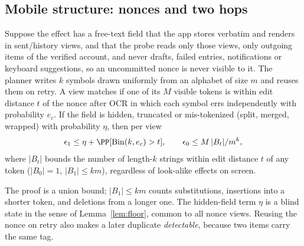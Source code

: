 \subsection{Mobile structure: nonces and two hops}
\label{sec:twohop}
\begin{lemma}
\label{lem:nonce}
Suppose the effect has a free-text field that the app stores verbatim and renders in sent/history views, and that the probe reads only those views, only outgoing items of
the verified account, and never drafts, failed entries, notifications or keyboard suggestions, so an uncommitted nonce is never visible to it. The planner writes $k$ symbols
drawn uniformly from an alphabet of size $m$ and reuses them on retry. A view matches if one of its $M$ visible tokens is within edit distance $t$ of the nonce after OCR in which
each symbol errs independently with probability $e_c$. If the field is hidden, truncated or mis-tokenized (split, merged, wrapped) with probability $\eta$, then per view
\begin{equation}
\epsilon_1\le\eta+\PP[\mathrm{Bin}(k,e_c)>t],\qquad \epsilon_0\le M\,|B_t|/m^k,
\label{eq:nonce}
\end{equation}
where $|B_t|$ bounds the number of length-$k$ strings within edit distance $t$ of any token ($|B_0|=1$, $|B_1|\le km$), regardless of look-alike effects on screen.
\end{lemma}
The proof is a union bound; $|B_1|\le km$ counts substitutions, insertions into a shorter token, and deletions from a longer one. The hidden-field term $\eta$ is a blind state in the
sense of Lemma~\ref{lem:floor}, common to all nonce views. Reusing the nonce on retry also makes a later duplicate \emph{detectable}, because two items carry the same tag.

